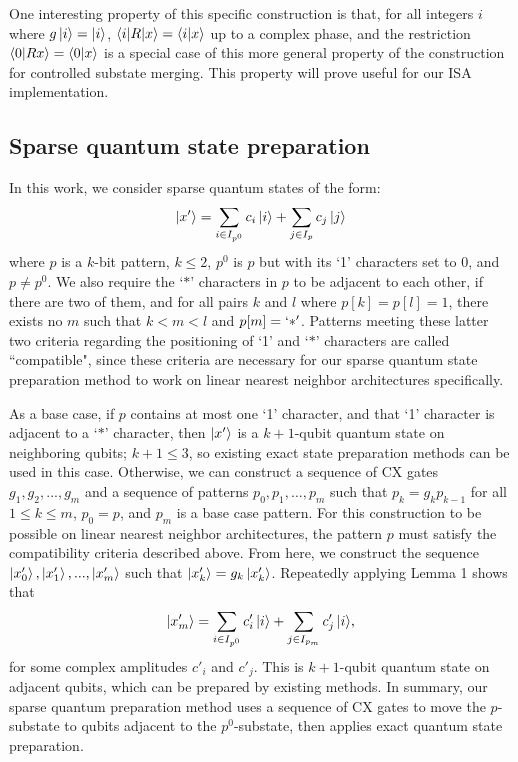 \documentclass{article}
\begin{document}
One interesting property of this specific construction is that, for all 
integers $i$ where $g\mathinner{|{i}\rangle} = \mathinner{|{i}\rangle}$, $\mathinner{\langle{i|R|x}\rangle} = \mathinner{\langle{i|x}\rangle}$ up to
a complex phase, and the restriction $\mathinner{\langle{0|Rx}\rangle} = \mathinner{\langle{0|x}\rangle}$ is a special
case of this more general property of the construction for controlled substate
merging. This property will prove useful for our ISA implementation.

\subsection{Sparse quantum state preparation}
In this work, we consider sparse quantum states of the form:
$$\mathinner{|{x'}\rangle} = \sum_{i \in I_{p^0}}{c_i\mathinner{|{i}\rangle}} + \sum_{j \in I_p}{c_j\mathinner{|{j}\rangle}}$$
where $p$ is a $k$-bit pattern, $k \leq 2$, $p^0$ is $p$ but with its `1'
characters set to 0, and $p \neq p^0$. We also require the `$*$' characters in 
$p$ to be adjacent
to each other, if there are two of them, and for all pairs $k$ and $l$
where $p[k] = p[l] = 1$, there exists no $m$ such that $k < m < l$ and 
$p[m] = `*'$. Patterns meeting these latter two criteria regarding the
positioning of `1' and `$*$' characters are called ``compatible", since these
criteria are necessary for our sparse quantum state preparation
method to work on linear nearest neighbor architectures specifically.

As a base case, if $p$ contains at most one `1' character, and that `1'
character is adjacent to a `$*$' character, then $\mathinner{|{x'}\rangle}$ is a $k + 1$-qubit
quantum state on neighboring qubits; $k + 1 \leq 3$, so existing exact state 
preparation methods can be used in this case. Otherwise, we can construct a 
sequence of CX gates
$g_1, g_2, ..., g_m$ and a sequence of patterns $p_0, p_1, ..., p_m$ such that
$p_k = g_kp_{k - 1}$ for all $1 \leq k \leq m$, $p_0 = p$, and $p_m$ is a base
case pattern. For this construction to be possible on linear nearest
neighbor architectures, the pattern $p$ must satisfy the compatibility criteria
described above. From here, we construct the sequence $\mathinner{|{x'_0}\rangle}, \mathinner{|{x'_1}\rangle},
..., \mathinner{|{x'_m}\rangle}$ such that $\mathinner{|{x'_k}\rangle} = g_k\mathinner{|{x'_k}\rangle}$. Repeatedly applying
Lemma 1 shows that 
$$\mathinner{|{x'_m}\rangle} = \sum_{i \in I_{p^0}}{c'_i\mathinner{|{i}\rangle}} + \sum_{j \in I_{p_m}}{c'_j\mathinner{|{i}\rangle}},$$
for some complex amplitudes $c'_i$ and $c'_j$.
This is $k+1$-qubit quantum state on adjacent qubits, which can be
prepared by existing methods. In summary, our sparse quantum preparation method
uses a sequence of CX gates to move the $p$-substate to qubits adjacent to the 
$p^0$-substate, then applies exact quantum state preparation.
\end{document}

